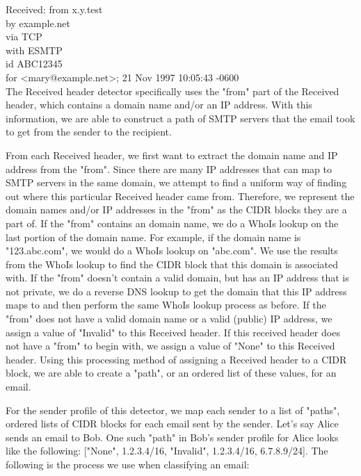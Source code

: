 \documentclass[letterpaper]{article}
\newcommand\tab[1][1cm]{\hspace*{#1}}
\begin{document}
Received: from x.y.test\\
\tab by example.net\\
\tab via TCP\\
\tab with ESMTP\\
\tab id ABC12345\\
\tab for <mary@example.net>;  21 Nov 1997 10:05:43 -0600\\

The Received header detector specifically uses the "from" part of the Received header, which contains a domain name and/or an IP address. With this information, we are able to construct a path of SMTP servers that the email took to get from the sender to the recipient. 

From each Received header, we first want to extract the domain name and IP address from the "from". Since there are many IP addresses that can map to SMTP servers in the same domain, we attempt to find a uniform way of finding out where this particular Received header came from. Therefore, we represent the domain names and/or IP addresses in the "from" as the CIDR blocks they are a part of. If the "from" contains an domain name, we do a WhoIs lookup on the last portion of the domain name. For example, if the domain name is "123.abc.com", we would do a WhoIs lookup on "abc.com". We use the results from the WhoIs lookup to find the CIDR block that this domain is associated with. If the "from" doesn't contain a valid domain, but has an IP address that is not private, we do a reverse DNS lookup to get the domain that this IP address maps to and then perform the same WhoIs lookup process as before. If the "from" does not have a valid domain name or a valid (public) IP address, we assign a value of "Invalid" to this Received header. If this received header does not have a "from" to begin with, we assign a value of "None" to this Received header. Using this processing method of assigning a Received header to a CIDR block, we are able to create a "path", or an ordered list of these values, for an email. 

For the sender profile of this detector, we map each sender to a list of "paths", ordered lists of CIDR blocks for each email sent by the sender. Let's say Alice sends an email to Bob. One such "path" in Bob's sender profile for Alice looks like the following: ["None", 1.2.3.4/16, "Invalid", 1.2.3.4/16, 6.7.8.9/24]. The following is the process we use when classifying an email:\\
\end{document}
